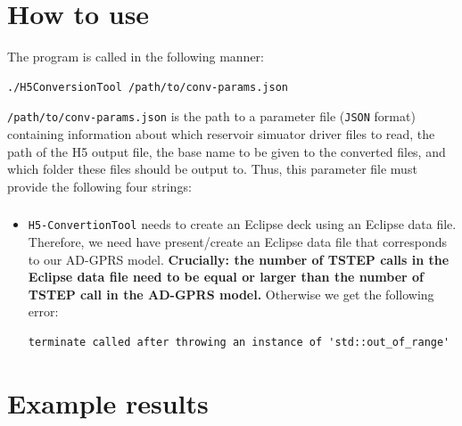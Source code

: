 

\section{How to use}

The program is called in the following manner:


\begin{lstlisting}[frame=single]
./H5ConversionTool /path/to/conv-params.json
\end{lstlisting}

\texttt{/path/to/conv-params.json} is the path to 
a parameter file (\texttt{JSON} format) containing 
information about which reservoir simuator driver 
files to read, the path of the H5 output file, 
the base name to be given to the converted files, 
and which folder these files should be output to.
% 
Thus, this parameter file must provide the following 
four strings:\clearpage



\subsubsection*{}
\begin{itemize}
	\item 
    \texttt{H5-ConvertionTool} needs to create an Eclipse 
    deck using an Eclipse data file. Therefore, we need have 
    present/create an Eclipse data file that corresponds to 
    our AD-GPRS model. {\bfseries Crucially: the number of 
    TSTEP calls in the Eclipse data file need to be equal 
    or larger than the number of TSTEP call in the AD-GPRS 
    model.} Otherwise we get the following error:
	
	\begin{lstlisting}[frame=single]
	terminate called after throwing an instance of 'std::out_of_range'
	\end{lstlisting}

\end{itemize}


\section{Example results}

